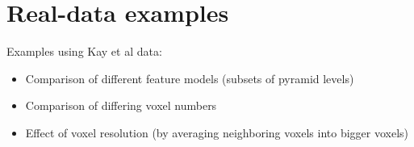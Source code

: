 \documentclass[12pt]{article}
\begin{document}
\section{Real-data examples}

Examples using Kay et al data:
\begin{itemize}
\item Comparison of different feature models (subsets of pyramid levels)
\item Comparison of differing voxel numbers
\item Effect of voxel resolution (by averaging neighboring voxels into bigger voxels)
\end{itemize}

{}

\end{document}
